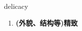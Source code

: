 
\begin{frame}
{\huge delicacy}
\begin{center}
\begin{enumerate}\Large
  \item \textbf{(外貌、结构等)精致}
\end{enumerate}
\end{center}
\end{frame}

